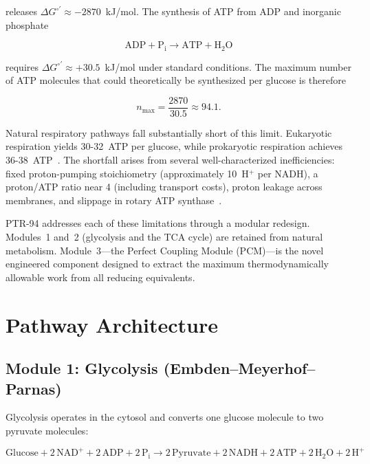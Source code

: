 \documentclass[12pt]{article}
\begin{document}
releases $\Delta G^{\circ\prime} \approx -2870$~kJ/mol. The synthesis of ATP from ADP and inorganic phosphate

\begin{equation}
\mathrm{ADP + P_i \longrightarrow ATP + H_2O}
\label{eq:atp_synthesis}
\end{equation}

requires $\Delta G^{\circ\prime} \approx +30.5$~kJ/mol under standard conditions. The maximum number of ATP molecules that could theoretically be synthesized per glucose is therefore

\begin{equation}
n_{\max} = \frac{2870}{30.5} \approx 94.1 .
\label{eq:theoretical_max}
\end{equation}

Natural respiratory pathways fall substantially short of this limit. Eukaryotic respiration yields 30-32~ATP per glucose, while prokaryotic respiration achieves 36-38~ATP~\cite{rich1997molecular,hinkle2005p/o}. The shortfall arises from several well-characterized inefficiencies: fixed proton-pumping stoichiometry (approximately 10~H$^+$ per NADH), a proton/ATP ratio near 4 (including transport costs), proton leakage across membranes, and slippage in rotary ATP synthase~\cite{ferguson2010bioenergetics}.

PTR-94 addresses each of these limitations through a modular redesign. Modules~1 and~2 (glycolysis and the TCA cycle) are retained from natural metabolism. Module~3---the Perfect Coupling Module (PCM)---is the novel engineered component designed to extract the maximum thermodynamically allowable work from all reducing equivalents.

\section{Pathway Architecture}

\subsection{Module 1: Glycolysis (Embden--Meyerhof--Parnas)}

Glycolysis operates in the cytosol and converts one glucose molecule to two pyruvate molecules:

\begin{equation}
\mathrm{Glucose + 2\,NAD^+ + 2\,ADP + 2\,P_i \longrightarrow 2\,Pyruvate + 2\,NADH + 2\,ATP + 2\,H_2O + 2\,H^+}
\label{eq:glycolysis}
\end{equation}
\end{document}

